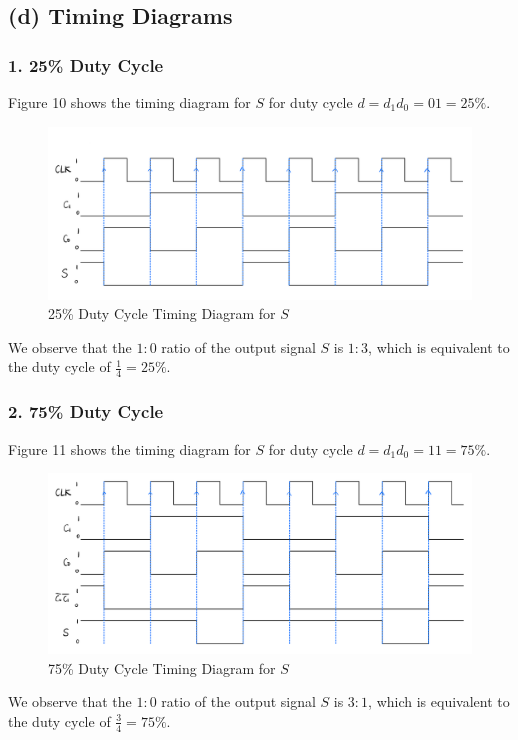 \documentclass{article}
\begin{document}
\subsection*{(d) Timing Diagrams}
\subsubsection*{1. 25\% Duty Cycle}
Figure 10 shows the timing diagram for $S$ for duty cycle $d = d_1d_0 = 01 = 25\%$.
\begin{figure}[!ht]
    \centering
    \includegraphics*[width=.9\linewidth]{src/Timing_25.png}
    \caption{25\% Duty Cycle Timing Diagram for $S$}
\end{figure}

We observe that the $1:0$ ratio of the output signal $S$ is $1:3$, which is equivalent to the duty cycle of $\frac{1}{4} = 25\%$.

\subsubsection*{2. 75\% Duty Cycle}
Figure 11 shows the timing diagram for $S$ for duty cycle $d = d_1d_0 = 11 = 75\%$.
\begin{figure}[!ht]
    \centering
    \includegraphics*[width=.9\linewidth]{src/Timing_75.png}
    \caption{75\% Duty Cycle Timing Diagram for $S$}
\end{figure}

We observe that the $1:0$ ratio of the output signal $S$ is $3:1$, which is equivalent to the duty cycle of $\frac{3}{4} = 75\%$.
\end{document}
